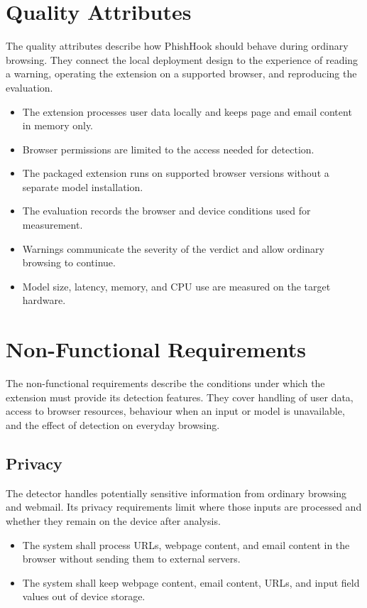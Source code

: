 \documentclass{FastFyp}
\begin{document}
\section{Quality Attributes}
The quality attributes describe how PhishHook should behave during ordinary browsing. They connect the local deployment design to the experience of reading a warning, operating the extension on a supported browser, and reproducing the evaluation.
\begin{itemize}
    \item The extension processes user data locally and keeps page and email content in memory only.
    \item Browser permissions are limited to the access needed for detection.
    \item The packaged extension runs on supported browser versions without a separate model installation.
    \item The evaluation records the browser and device conditions used for measurement.
    \item Warnings communicate the severity of the verdict and allow ordinary browsing to continue.
    \item Model size, latency, memory, and CPU use are measured on the target hardware.
\end{itemize}

\section{Non-Functional Requirements}
The non-functional requirements describe the conditions under which the extension must provide its detection features. They cover handling of user data, access to browser resources, behaviour when an input or model is unavailable, and the effect of detection on everyday browsing.

\subsection{Privacy}
The detector handles potentially sensitive information from ordinary browsing and webmail. Its privacy requirements limit where those inputs are processed and whether they remain on the device after analysis.

\begin{itemize}
    \item The system shall process URLs, webpage content, and email content in the browser without sending them to external servers.
    \item The system shall keep webpage content, email content, URLs, and input field values out of device storage.
\end{itemize}
\end{document}
